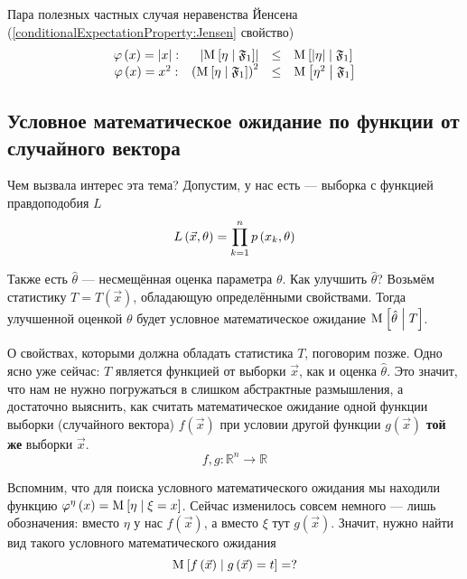 Пара полезных частных случая неравенства Йенсена
(\ref{conditionalExpectationProperty:Jensen} свойство)
$$\begin{array}{crcl}
  \varphi\left( x \right) = \left|x\right|:&
      \left| \operatorname{M}_{} \left[ \eta \;\middle|\; \mathfrak{F}_1 \right] \right|
      &\le& \operatorname{M}_{} \left[ \left| \eta \right| \;\middle|\; \mathfrak{F}_1 \right] \\
  \varphi\left( x \right) = x^2:&
      \left( \operatorname{M}_{} \left[ \eta \;\middle|\; \mathfrak{F}_1 \right] \right)^2
      &\le& \operatorname{M}_{} \left[ \eta^2 \;\middle|\; \mathfrak{F}_1 \right]
\end{array}$$

\subsection{Условное математическое ожидание по функции
  от случайного вектора}\label{conditionalExpectationSubsection}

Чем вызвала интерес эта тема?
Допустим, у нас есть \xsample --- выборка с функцией правдоподобия $L$
$$L\left( \vec{x}, \theta \right) = \prod_{k=1}^n p\left(x_k, \theta\right)$$

Также есть $\hat{\theta}$ --- несмещённая оценка параметра $\theta$.
Как улучшить $\hat{\theta}$?
Возьмём статистику $T = T\left( \vec{x} \right)$,
обладающую определёнными свойствами.
Тогда улучшенной оценкой $\theta$ будет условное математическое ожидание
$\operatorname{M}_{} \left[  \hat{\theta} \;\middle|\; T  \right]$.

О свойствах, которыми должна обладать статистика $T$, поговорим позже.
Одно ясно уже сейчас: $T$ является функцией от выборки $\vec{x}$,
как и оценка $\hat{\theta}$.
Это значит, что нам не нужно погружаться в слишком абстрактные размышления,
а достаточно выяснить, как считать математическое ожидание
одной функции выборки (случайного вектора) $f\left( \vec{x} \right)$
при условии другой функции $g\left( \vec{x} \right)$
\textbf{той же} выборки $\vec{x}$.
$$f,g: \mathbb{R}^n \rightarrow \mathbb{R}$$

Вспомним, что для поиска условного математического ожидания
мы находили функцию
$\varphi^{\eta}\left( x \right) = \operatorname{M}_{} \left[  \eta \;\middle|\; \xi = x  \right]$.
Сейчас изменилось совсем немного --- лишь обозначения:
вместо $\eta$ у нас $f\left( \vec{x} \right)$,
а вместо $\xi$ тут $g\left( \vec{x} \right)$.
Значит, нужно найти вид такого условного математического ожидания
\begin{equation*}
  \operatorname{M}_{} \left[ f\left( \vec{x} \right) \;\middle|\; g\left( \vec{x} \right) = t \right] = ?
\end{equation*}

